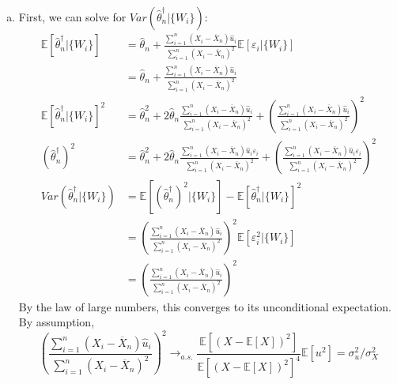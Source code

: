 \documentclass{article}
\newcommand{\olx}[1]{\overline{X}_{#1}}
\newcommand{\sumn}{\sum_{i=1}^{n}}
\newcommand{\eps}{\varepsilon}
\newcommand{\that}{\hat{\theta}_n}
\newcommand{\tchat}{\that^\dagger}
\newcommand{\E}[1]{\mathbb{E}\left[#1\right]}%
\begin{document}
\begin{enumerate}[(a)]
    \item First, we can solve for ${Var(\tchat|\{W_i\})}$:\begin{align*}
        \E{\tchat|\{W_i\}} &= \that + \frac{\sumn(X_i - \olx{n})\hat{u}_i}{\sumn(X_i - \olx{n})^2}\E{\eps_i|\{W_i\}} \\
                    &= \that + \frac{\sumn(X_i - \olx{n})\hat{u}_i}{\sumn(X_i - \olx{n})^2}  \\
        \E{\tchat|\{W_i\}}^2 &=  \that^2 + 2\that\frac{\sumn(X_i - \olx{n})\hat{u}_i}{\sumn(X_i - \olx{n})^2} + \left(\frac{\sumn(X_i - \olx{n})\hat{u}_i}{\sumn(X_i - \olx{n})^2}\right)^2    \\
        (\tchat)^2 &= \that^2 + 2\that\frac{\sumn(X_i - \olx{n})\hat{u}_i\eps_i}{\sumn(X_i - \olx{n})^2} + \left(\frac{\sumn(X_i - \olx{n})\hat{u}_i\eps_i}{\sumn(X_i - \olx{n})^2}\right)^2   \\
        Var(\tchat|\{W_i\}) &= \E{(\tchat)^2|\{W_i\}} - \E{\tchat|\{W_i\}}^2 \\
            &= \left(\frac{\sumn(X_i - \olx{n})\hat{u}_i}{\sumn(X_i - \olx{n})^2}\right)^2\E{\eps_i^2|\{W_i\}}    \\
            &= \left(\frac{\sumn(X_i - \olx{n})\hat{u}_i}{\sumn(X_i - \olx{n})^2}\right)^2
    \end{align*}
    By the law of large numbers, this converges to its unconditional expectation. By assumption,\[
        \left(\frac{\sumn(X_i - \olx{n})\hat{u}_i}{\sumn(X_i - \olx{n})^2}\right)^2 \rightarrow_{a.s.} \frac{\E{(X-\E{X})^2}}{\E{(X-\E{X})^2}^4}\E{u^2} = \sigma_u^2/\sigma_X^2
    \]
\end{enumerate}

\end{document}
